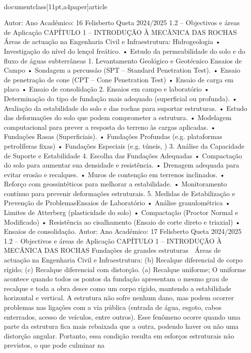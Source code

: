 \\documentclass[11pt,a4paper]{article}
\begin{document}
Autor:
Ano Académico:
16
Felisberto Queta
2024/2025
1.2 – Objectivos e áreas de Aplicação
CAPÍTULO 1 
–
 INTRODUÇÃO À MECÂNICA DAS ROCHAS
 Áreas de actuação na Engenharia Civil e Infraestrutura:
Hidrogeologia
• Investigação do nível do lençol freático.
• Estudo da permeabilidade do solo e do fluxo de águas 
subterrâneas
1. Levantamento Geológico e Geotécnico
Ensaios de Campo
• Sondagem a percussão (SPT – Standard Penetration Test).
• Ensaio de penetração de cone (CPT – Cone Penetration
Test)
• Ensaio de carga em placa
• Ensaio de consolidação
2. Ensaios em campo e laboratório
• Determinação do tipo de fundação mais adequado (superficial ou 
profunda).
• Avaliação da estabilidade do solo e das rochas para suportar 
estruturas.
• Estudo das deformações do solo que podem comprometer a 
estrutura.
• Modelagem computacional para prever a resposta do terreno às 
cargas aplicadas.
• Fundações Rasas (Superficiais).
• Fundações Profundas (e.g. plataformas petrolíferas fixas)
• Fundações Especiais (e.g. túneis, )
3. Análise da Capacidade de Suporte e Estabilidade
4. Escolha das Fundações Adequadas
• Compactação do solo para aumentar sua densidade e 
resistência.
• Drenagem adequada para evitar erosão e recalques.
• Muros de contenção em terrenos inclinados.
• Reforço com geossintéticos para melhorar a estabilidade.
• Monitoramento contínuo para prevenir deformações estruturais.
5. Medidas de Estabilização e Prevenção de ProblemasEnsaios de Laboratório
• Análise granulométrica
• Limites de Atterberg (plasticidade do solo)
• Compactação (Proctor Normal e Modificado)
• Resistência ao cisalhamento (Ensaio de corte direto e 
triaxial)
• Ensaios de consolidação.
Autor:
Ano Académico:
17
Felisberto Queta
2024/2025
1.2 – Objectivos e áreas de Aplicação
CAPÍTULO 1 
–
 INTRODUÇÃO À MECÂNICA DAS ROCHAS
Fundações de grandes estruturas
 Áreas de actuação na Engenharia Civil e Infraestrutura:
(b) Recalque diferencial de corpo 
rígido; 
(c) Recalque diferencial com 
distorção. (a) Recalque uniforme; 
O uniforme acontece quando todos os 
pontos da fundação apresentam o mesmo 
grau de recalque e toda a obra desce como 
um corpo rígido, mantendo a estabilidade 
horizontal e vertical. A estrutura não sofre 
nenhum dano, mas podem ocorrer problemas 
nas ligações com a via pública (entrada de 
água, esgoto, cabos enterrados, acesso de 
veículos, entre outros).
Esse fenômeno ocorre quando uma 
parte da estrutura fica mais rebaixada 
que a outra, podendo haver ou não uma 
distorção angular. Portanto, essa 
condição resulta em esforços estruturais 
não previstos, o que pode culminar na 
\end{document}
